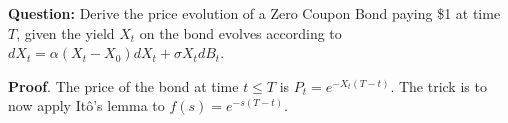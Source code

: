 \documentclass{article}
\begin{document}
\begin{tcolorbox}[colframe=black,colback=gray!5,boxrule=0.5pt]
\textbf{Question:} Derive the price evolution of a Zero Coupon Bond paying \$1 at time $T$, given the yield $X_t$ on the bond evolves according to $dX_t = \alpha(X_t-X_0)dX_t + \sigma X_tdB_t$. \cite{Hull}
\end{tcolorbox}
\textbf{Proof}. The price of the bond at time $t\leq T$ is $P_t = e^{-X_t(T-t)}$. The trick is to now apply Itô's lemma to $f(s) = e^{-s(T-t)}$.
\newpage
 
\end{document}
